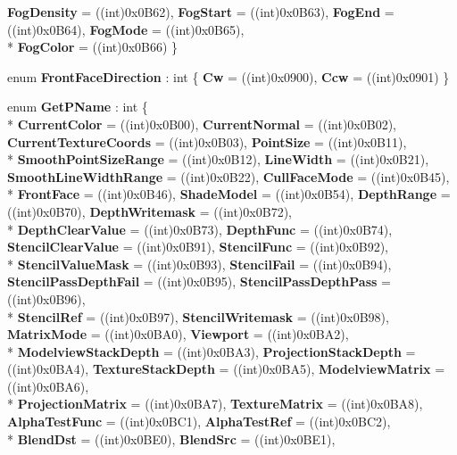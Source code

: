 \begin{DoxyCompactItemize}
{\bfseries Fog\-Density} = ((int)0x0\-B62), 
{\bfseries Fog\-Start} = ((int)0x0\-B63), 
{\bfseries Fog\-End} = ((int)0x0\-B64), 
{\bfseries Fog\-Mode} = ((int)0x0\-B65), 
\\*
{\bfseries Fog\-Color} = ((int)0x0\-B66)
 \}
\item 
enum {\bfseries Front\-Face\-Direction} \-: int \{ {\bfseries Cw} = ((int)0x0900), 
{\bfseries Ccw} = ((int)0x0901)
 \}
\item 
enum {\bfseries Get\-P\-Name} \-: int \{ \\*
{\bfseries Current\-Color} = ((int)0x0\-B00), 
{\bfseries Current\-Normal} = ((int)0x0\-B02), 
{\bfseries Current\-Texture\-Coords} = ((int)0x0\-B03), 
{\bfseries Point\-Size} = ((int)0x0\-B11), 
\\*
{\bfseries Smooth\-Point\-Size\-Range} = ((int)0x0\-B12), 
{\bfseries Line\-Width} = ((int)0x0\-B21), 
{\bfseries Smooth\-Line\-Width\-Range} = ((int)0x0\-B22), 
{\bfseries Cull\-Face\-Mode} = ((int)0x0\-B45), 
\\*
{\bfseries Front\-Face} = ((int)0x0\-B46), 
{\bfseries Shade\-Model} = ((int)0x0\-B54), 
{\bfseries Depth\-Range} = ((int)0x0\-B70), 
{\bfseries Depth\-Writemask} = ((int)0x0\-B72), 
\\*
{\bfseries Depth\-Clear\-Value} = ((int)0x0\-B73), 
{\bfseries Depth\-Func} = ((int)0x0\-B74), 
{\bfseries Stencil\-Clear\-Value} = ((int)0x0\-B91), 
{\bfseries Stencil\-Func} = ((int)0x0\-B92), 
\\*
{\bfseries Stencil\-Value\-Mask} = ((int)0x0\-B93), 
{\bfseries Stencil\-Fail} = ((int)0x0\-B94), 
{\bfseries Stencil\-Pass\-Depth\-Fail} = ((int)0x0\-B95), 
{\bfseries Stencil\-Pass\-Depth\-Pass} = ((int)0x0\-B96), 
\\*
{\bfseries Stencil\-Ref} = ((int)0x0\-B97), 
{\bfseries Stencil\-Writemask} = ((int)0x0\-B98), 
{\bfseries Matrix\-Mode} = ((int)0x0\-B\-A0), 
{\bfseries Viewport} = ((int)0x0\-B\-A2), 
\\*
{\bfseries Modelview\-Stack\-Depth} = ((int)0x0\-B\-A3), 
{\bfseries Projection\-Stack\-Depth} = ((int)0x0\-B\-A4), 
{\bfseries Texture\-Stack\-Depth} = ((int)0x0\-B\-A5), 
{\bfseries Modelview\-Matrix} = ((int)0x0\-B\-A6), 
\\*
{\bfseries Projection\-Matrix} = ((int)0x0\-B\-A7), 
{\bfseries Texture\-Matrix} = ((int)0x0\-B\-A8), 
{\bfseries Alpha\-Test\-Func} = ((int)0x0\-B\-C1), 
{\bfseries Alpha\-Test\-Ref} = ((int)0x0\-B\-C2), 
\\*
{\bfseries Blend\-Dst} = ((int)0x0\-B\-E0), 
{\bfseries Blend\-Src} = ((int)0x0\-B\-E1), 

\end{DoxyCompactItemize}
